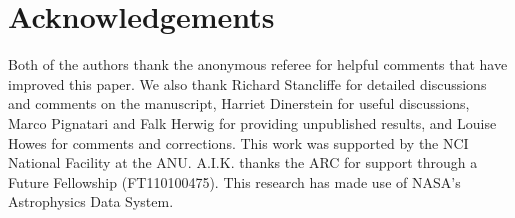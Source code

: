 \section*{Acknowledgements}
Both of the authors thank the anonymous referee for helpful comments that have improved this paper. We also thank Richard Stancliffe for detailed discussions and comments on the manuscript, Harriet Dinerstein for useful discussions, Marco Pignatari and Falk Herwig for providing unpublished results, and Louise Howes for comments and corrections.
This work was supported by the NCI National Facility at the ANU. A.I.K. thanks the ARC for support through a Future Fellowship (FT110100475). This research has made use of NASA's Astrophysics Data System.
